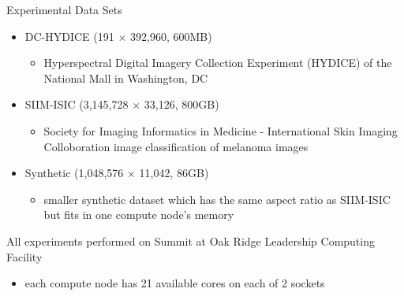 \documentclass{beamer}
\begin{document}
\begin{frame}{Experimental Data Sets}
    \begin{itemize}
        \item DC-HYDICE (191 $\times$ 392{,}960, 600MB)
        \begin{itemize}
            \item Hyperspectral Digital Imagery Collection Experiment (HYDICE) of the National Mall in Washington, DC
        \end{itemize}
        \vfill
        \item SIIM-ISIC (3{,}145{,}728 $\times$ 33{,}126, 800GB)
        \begin{itemize}
            \item Society for Imaging Informatics in Medicine - International Skin Imaging Colloboration image classification of melanoma images
        \end{itemize}
        \vfill
        \item Synthetic (1{,}048{,}576 $\times$ 11{,}042, 86GB)
        \begin{itemize}
            \item smaller synthetic dataset which has the same aspect ratio as SIIM-ISIC but fits in one compute node's memory
        \end{itemize}
    \end{itemize}
    \vfill
    \scriptsize
    	All experiments performed on Summit at Oak Ridge Leadership Computing Facility
	\begin{itemize}
		\item each compute node has 21 available cores on each of 2 sockets
	\end{itemize}
    
\end{frame}

\newcommand{\figscal}{.75\textwidth}
\end{document}
